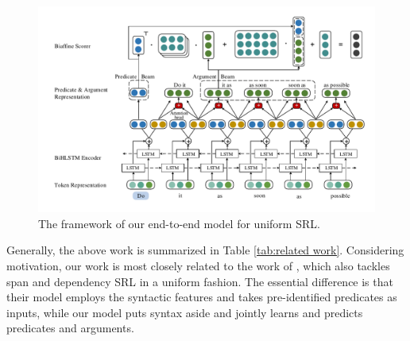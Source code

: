\documentclass[letterpaper]{article} %
\begin{document}
%		
%		

\begin{figure}
	\centering
	\includegraphics[scale=0.82]{system.pdf}
	\caption{\label{fig:overview} The framework of our end-to-end model for uniform SRL.}
\end{figure}


Generally, the above work is summarized in Table \ref{tab:related work}. Considering motivation, our work is most closely related to the work of \citeauthor{Fitzgerald2015} , which also tackles span and dependency SRL in a uniform fashion. The essential difference is that their model employs the syntactic features and takes pre-identified predicates as inputs, while our model puts syntax aside and jointly learns and predicts predicates and arguments. %
\end{document}
